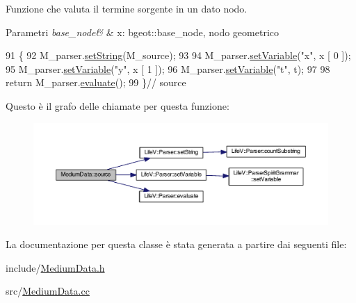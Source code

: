 Funzione che valuta il termine sorgente in un dato nodo. 


\begin{DoxyParams}{Parametri}
{\em base\-\_\-node\&} & x\-: bgeot\-::base\-\_\-node, nodo geometrico \\
\hline
\end{DoxyParams}

\begin{DoxyCode}
91 \{
92     M\_parser.\hyperlink{classLifeV_1_1Parser_ac05769e836a0dc95d9c020df361a5194}{setString}(M\_source);
93 
94     M\_parser.\hyperlink{classLifeV_1_1Parser_aa2b362e12b8feb60231705d499c9fbae}{setVariable}(\textcolor{stringliteral}{"x"}, x [ 0 ]);
95     M\_parser.\hyperlink{classLifeV_1_1Parser_aa2b362e12b8feb60231705d499c9fbae}{setVariable}(\textcolor{stringliteral}{"y"}, x [ 1 ]);
96     M\_parser.\hyperlink{classLifeV_1_1Parser_aa2b362e12b8feb60231705d499c9fbae}{setVariable}(\textcolor{stringliteral}{"t"}, t);
97 
98     \textcolor{keywordflow}{return} M\_parser.\hyperlink{classLifeV_1_1Parser_a51d84fd4ae6d420620e7beee58fad673}{evaluate}();
99 \}\textcolor{comment}{// source}
\end{DoxyCode}


Questo è il grafo delle chiamate per questa funzione\-:\nopagebreak
\begin{figure}[H]
\begin{center}
\leavevmode
\includegraphics[width=350pt]{classMediumData_a1f5a2647becdcd8db8ad4c1a9b79b29e_cgraph}
\end{center}
\end{figure}




La documentazione per questa classe è stata generata a partire dai seguenti file\-:\begin{DoxyCompactItemize}
\item 
include/\hyperlink{MediumData_8h}{Medium\-Data.\-h}\item 
src/\hyperlink{MediumData_8cc}{Medium\-Data.\-cc}\end{DoxyCompactItemize}
